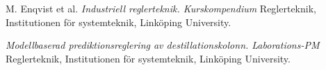 \documentclass[conference]{IEEEtran}
\begin{document}
\begin{thebibliography}{1}

  M. Enqvist et al. \emph{Industriell reglerteknik. Kurskompendium}
  Reglerteknik, Institutionen för systemteknik, Linköping University.

  \emph{Modellbaserad prediktionsreglering av destillationskolonn. Laborations-PM}
  Reglerteknik, Institutionen för systemteknik, Linköping University.

\end{thebibliography}

\clearpage

\onecolumn
\appendix


\end{document}
